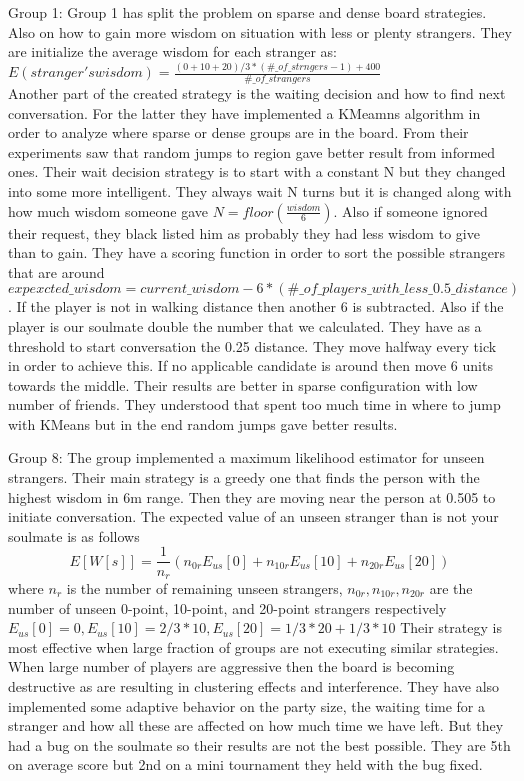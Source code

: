 Group 1:
Group 1 has split the problem on sparse and dense board strategies. Also on how 
to gain more wisdom on situation with less or plenty strangers. They are initialize
the average wisdom for each stranger as: $E(stranger's wisdom) = \frac{(0+10+20)/3 * (\#\_of\_strngers-1)+400}{\#\_of\_strangers}$\\
Another part of the created strategy is the waiting decision and how to find next
conversation.
For the latter they have implemented a KMeamns algorithm in order to analyze
where sparse or dense groups are in the board. From their experiments saw that 
random jumps to region gave better result from informed ones. Their wait decision
strategy is to start with a constant N but they changed into some more intelligent.
They always wait N turns but it is changed along with how much wisdom someone
gave $N = floor(\frac{wisdom}{6})$. Also if someone ignored their request, they
black listed him as probably they had less wisdom to give than to gain. They have
a scoring function in order to sort the possible strangers that are around 
$expexcted\_wisdom = current\_wisdom-6*(\#\_of\_players\_with\_less\_0.5\_distance)$.
If the player is not in walking distance then another 6 is subtracted. Also if 
the player is our soulmate double the number that we calculated. They have as a 
threshold to start conversation the 0.25 distance. They move halfway every tick 
in order to achieve this. If no applicable candidate is around then move 6 units
towards the middle. Their results are better in sparse configuration with low number
of friends. They understood that spent too much time in where to jump with KMeans
but in the end random jumps gave better results.

Group 8:
The group implemented a maximum likelihood estimator for unseen strangers. Their
main strategy is a greedy one that finds the person with the highest wisdom in 6m
range. Then they are moving near the person at 0.505 to initiate conversation.
The expected value of an unseen stranger than is not your soulmate is as follows
\begin{equation*}
E[W[s]] = \frac{1}{n_r}(n_{0r}E_{us}[0] + n_{10r}E_{us}[10] + n_{20r}E_{us}[20])
\end{equation*}
where $n_r$ is the number of remaining unseen strangers, $n_{0r},n_{10r},n_{20r}$
are the number of unseen 0-point, 10-point, and 20-point strangers respectively
$E_{us}[0]=0,E_{us}[10] = 2/3 *10,E_{us}[20] = 1/3*20+1/3*10$
Their strategy is most effective when large fraction of groups are not executing 
similar strategies. When large number of players are aggressive then the board
is becoming destructive as are resulting in clustering effects and interference.
They have also implemented some adaptive behavior on the party size, the waiting
time for a stranger and how all these are affected on how much time we have left.
But they had a bug on the soulmate so their results are not the best possible.
They are 5th on average score but 2nd on a mini tournament they held with the bug
fixed.

